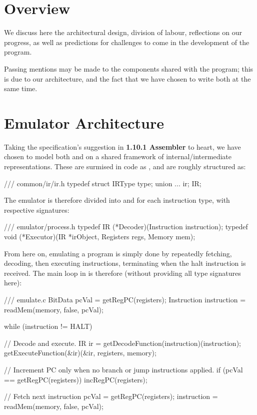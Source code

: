 \documentclass{ictex}
\begin{document}
\section{Overview} \vspace{-1em}

We discuss here the architectural design, division of labour, reflections on our progress, as well as predictions for challenges to come in the development of the  program.

Passing mentions may be made to the components shared with the  program; this is due to our architecture, and the fact that we have chosen to write both at the same time.

\vspace{-1em} \section{Emulator Architecture} \vspace{-1em}

Taking the specification's suggestion in \textbf{1.10.1 Assembler} to heart, we have chosen to model both  and  on a shared framework of internal/intermediate representations. These are surmised in code as , and are roughly structured as:

\begin{code}
    /// common/ir/ir.h
    typedef struct {
        IRType type;
        union { ... } ir;
    } IR;
\end{code}

The emulator is therefore divided into  and  for each instruction type, with respective signatures:

\begin{code}
    /// emulator/process.h
    typedef IR (*Decoder)(Instruction instruction);
    typedef void (*Executor)(IR *irObject, Registers regs, Memory mem);
\end{code}

From here on, emulating a program is simply done by repeatedly fetching, decoding, then executing instructions, terminating when the halt instruction is received. The main loop in  is therefore (without providing all type signatures here):

\begin{code}
    /// emulate.c
    BitData pcVal = getRegPC(registers);
    Instruction instruction = readMem(memory, false, pcVal);

    while (instruction != HALT) {
        // Decode and execute.
        IR ir = getDecodeFunction(instruction)(instruction);
        getExecuteFunction(&ir)(&ir, registers, memory);

        // Increment PC only when no branch or jump instructions applied.
        if (pcVal == getRegPC(registers)) incRegPC(registers);

        // Fetch next instruction
        pcVal = getRegPC(registers);
        instruction = readMem(memory, false, pcVal);
    }
\end{code}
\end{document}
